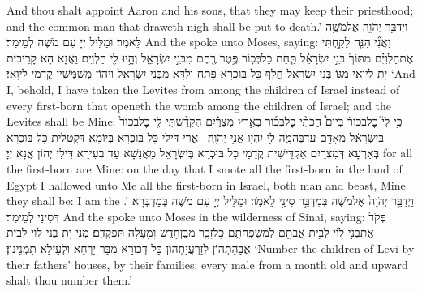 {And thou shalt appoint Aaron and his sons, that they may keep their priesthood; and the common man that draweth nigh shall be put to death.’}{}
{וַיְדַבֵּ֥ר יְהֹוָ֖ה אֶל\maqqaf מֹשֶׁ֥ה לֵּאמֹֽר׃}
{וּמַלֵּיל יְיָ עִם מֹשֶׁה לְמֵימַר׃}
{And the \lord\space spoke unto Moses, saying:}{}
{וַאֲנִ֞י הִנֵּ֧ה לָקַ֣חְתִּי אֶת\maqqaf הַלְוִיִּ֗ם מִתּוֹךְ֙ בְּנֵ֣י יִשְׂרָאֵ֔ל תַּ֧חַת כׇּל\maqqaf בְּכ֛וֹר פֶּ֥טֶר רֶ֖חֶם מִבְּנֵ֣י יִשְׂרָאֵ֑ל וְהָ֥יוּ לִ֖י הַלְוִיִּֽם׃}
{וַאֲנָא הָא קָרֵיבִית יָת לֵיוָאֵי מִגּוֹ בְּנֵי יִשְׂרָאֵל חֲלָף כָּל בּוּכְרָא פָּתַח וַלְדָּא מִבְּנֵי יִשְׂרָאֵל וִיהוֹן מְשַׁמְּשִׁין קֳדָמַי לֵיוָאֵי׃}
{‘And I, behold, I have taken the Levites from among the children of Israel instead of every first-born that openeth the womb among the children of Israel; and the Levites shall be Mine;}{}
{כִּ֣י לִי֮ כׇּל\maqqaf בְּכוֹר֒ בְּיוֹם֩ הַכֹּתִ֨י כׇל\maqqaf בְּכ֜וֹר בְּאֶ֣רֶץ מִצְרַ֗יִם הִקְדַּ֨שְׁתִּי לִ֤י כׇל\maqqaf בְּכוֹר֙ בְּיִשְׂרָאֵ֔ל מֵאָדָ֖ם עַד\maqqaf בְּהֵמָ֑ה לִ֥י יִהְי֖וּ אֲנִ֥י יְהֹוָֽה׃ \petucha }
{אֲרֵי דִּילִי כָּל בּוּכְרָא בְּיוֹמָא דִּקְטַלִית כָּל בּוּכְרָא בְּאַרְעָא דְּמִצְרַיִם אַקְדֵּישִׁית קֳדָמַי כָל בּוּכְרָא בְּיִשְׂרָאֵל מֵאֲנָשָׁא עַד בְּעִירָא דִּילִי יְהוֹן אֲנָא יְיָ׃}
{for all the first-born are Mine: on the day that I smote all the first-born in the land of Egypt I hallowed unto Me all the first-born in Israel, both man and beast, Mine they shall be: I am the \lord.’}{}
{וַיְדַבֵּ֤ר יְהֹוָה֙ אֶל\maqqaf מֹשֶׁ֔ה בְּמִדְבַּ֥ר סִינַ֖י לֵאמֹֽר׃}
{וּמַלֵּיל יְיָ עִם מֹשֶׁה בְּמַדְבְּרָא דְּסִינַי לְמֵימַר׃}
{And the \lord\space spoke unto Moses in the wilderness of Sinai, saying:}{}
{פְּקֹד֙ אֶת\maqqaf בְּנֵ֣י לֵוִ֔י לְבֵ֥ית אֲבֹתָ֖ם לְמִשְׁפְּחֹתָ֑ם כׇּל\maqqaf זָכָ֛ר מִבֶּן\maqqaf חֹ֥דֶשׁ וָמַ֖עְלָה תִּפְקְדֵֽם׃}
{מְנִי יָת בְּנֵי לֵוִי לְבֵית אֲבָהָתְהוֹן לְזַרְעֲיָתְהוֹן כָּל דְּכוּרָא מִבַּר יַרְחָא וּלְעֵילָא תִּמְנֵינוּן׃}
{‘Number the children of Levi by their fathers’ houses, by their families; every male from a month old and upward shalt thou number them.’}{}
